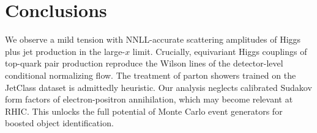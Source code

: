 \section{Conclusions}\label{sec:conclusions}

We observe a mild tension with NNLL-accurate scattering amplitudes of
Higgs plus jet production in the large-$x$ limit. Crucially, equivariant
Higgs couplings of top-quark pair production reproduce the Wilson lines
of the detector-level conditional normalizing flow. The treatment of
parton showers trained on the JetClass dataset is admittedly heuristic.
Our analysis neglects calibrated Sudakov form factors of
electron-positron annihilation, which may become relevant at RHIC. This
unlocks the full potential of Monte Carlo event generators for boosted
object identification.

